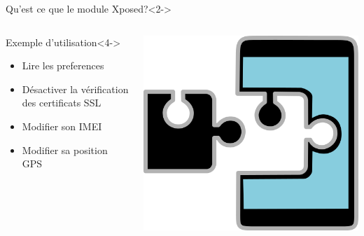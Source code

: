 \documentclass[aspectratio=1610, ]{beamer}%
\begin{document}
  \begin{frame}[t]
    \slidetitle[Xposed]
    \begin{block}{Qu'est ce que le module Xposed?}<2->
    \end{block}
    \begin{columns} 
      \begin{column}{0.7\linewidth}
        \begin{block}{Exemple d'utilisation}<4->
          \begin{itemize}
          \item<5-> Lire les preferences 
          \item<6-> Désactiver la vérification des certificats SSL
          \item<7-> Modifier son IMEI
          \item<8-> Modifier sa position GPS
          \end{itemize}
        \end{block}
      \end{column}
      \begin{column}{0.25\linewidth}
        \centering
        \includegraphics[width=0.9\linewidth]{xposed.png}
      \end{column}
    \end{columns}
  \end{frame}
\end{document}
